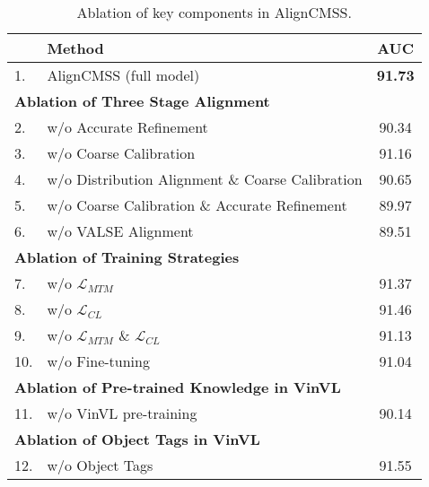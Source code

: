 \documentclass[letterpaper]{article} \usepackage{aaai24}  \usepackage{times}  \usepackage{helvet}  \usepackage{courier}  \usepackage[hyphens]{url}  \usepackage{graphicx} \urlstyle{rm} \def\UrlFont{\rm}  \usepackage{natbib}  \usepackage{caption} \frenchspacing  \setlength{\pdfpagewidth}{8.5in}  \setlength{\pdfpageheight}{11in}
\begin{document}
\begin{table}[t]
\centering
\scalebox{1.08}
{\scriptsize
\begin{tabular}{llc}
\toprule
         & \multicolumn{1}{l|}{\textbf{Method}}                & \textbf{AUC}   \\ \hline
1.       & \multicolumn{1}{l|}{AlignCMSS (full model)}                     & \textbf{91.73} \\ \hline
\multicolumn{2}{l|}{\textbf{Ablation of Three Stage Alignment}}         &                \\
2.       & \multicolumn{1}{l|}{w/o Accurate Refinement}          & 90.34          \\
3.       & \multicolumn{1}{l|}{w/o Coarse Calibration}       & 91.16          \\
4.       & \multicolumn{1}{l|}{w/o   Distribution Alignment \& Coarse Calibration}         & 90.65          \\
5.      & \multicolumn{1}{l|}{w/o    Coarse Calibration \& Accurate Refinement}        & 89.97          \\
6.      & \multicolumn{1}{l|}{w/o    VALSE Alignment}        & 89.51          \\
\multicolumn{2}{l|}{\textbf{Ablation of Training Strategies}} &                \\
7.       & \multicolumn{1}{l|}{w/o $\mathcal{L}_{MTM}$}                       &  91.37              \\
8.       & \multicolumn{1}{l|}{w/o $\mathcal{L}_{CL}$}                        &  91.46              \\
9.       & \multicolumn{1}{l|}{w/o $\mathcal{L}_{MTM}$ \& $\mathcal{L}_{CL}$}                      &     91.13           \\
10.       & \multicolumn{1}{l|}{w/o Fine-tuning}                      &      91.04          \\
\multicolumn{2}{l|}{\textbf{Ablation of Pre-trained Knowledge in VinVL}} &                \\
11.       & \multicolumn{1}{l|}{w/o VinVL pre-training}                       &    90.14         \\
\multicolumn{2}{l|}{\textbf{Ablation of Object Tags in VinVL}} &                \\
12.       & \multicolumn{1}{l|}{w/o Object Tags}                       &    91.55         \\
\bottomrule
\end{tabular}}
\caption{Ablation of key components in AlignCMSS.}
\vspace{-5pt}
\label{tab:ablation}
\end{table}
\end{document}

